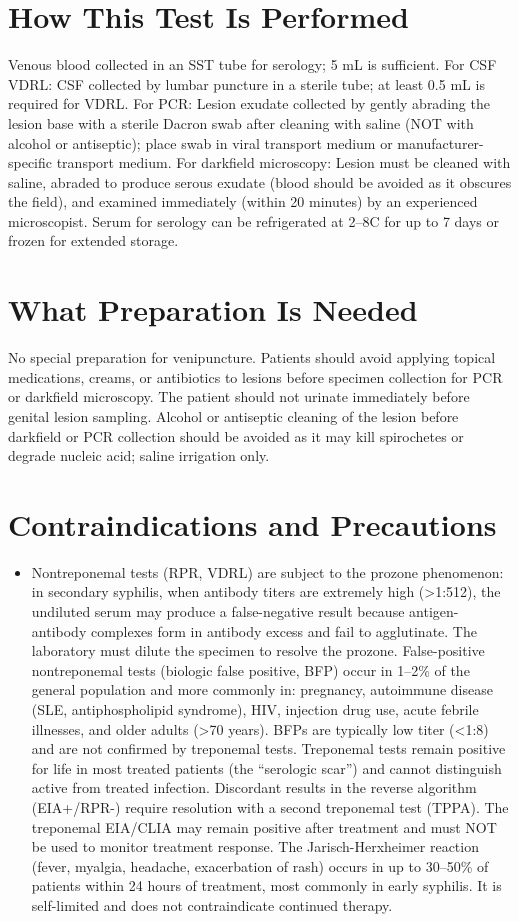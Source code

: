 \section*{How This Test Is Performed}
Venous blood collected in an SST tube for serology; 5 mL is sufficient. For CSF VDRL: CSF collected by lumbar puncture in a sterile tube; at least 0.5 mL is required for VDRL. For PCR: Lesion exudate collected by gently abrading the lesion base with a sterile Dacron swab after cleaning with saline (NOT with alcohol or antiseptic); place swab in viral transport medium or manufacturer-specific transport medium. For darkfield microscopy: Lesion must be cleaned with saline, abraded to produce serous exudate (blood should be avoided as it obscures the field), and examined immediately (within 20 minutes) by an experienced microscopist. Serum for serology can be refrigerated at 2--8\textdegree{}C for up to 7 days or frozen for extended storage.

\section*{What Preparation Is Needed}
No special preparation for venipuncture. Patients should avoid applying topical medications, creams, or antibiotics to lesions before specimen collection for PCR or darkfield microscopy. The patient should not urinate immediately before genital lesion sampling. Alcohol or antiseptic cleaning of the lesion before darkfield or PCR collection should be avoided as it may kill spirochetes or degrade nucleic acid; saline irrigation only.

\section*{Contraindications and Precautions}
\begin{itemize}
  \item Nontreponemal tests (RPR, VDRL) are subject to the prozone phenomenon: in secondary syphilis, when antibody titers are extremely high (>1:512), the undiluted serum may produce a false-negative result because antigen-antibody complexes form in antibody excess and fail to agglutinate. The laboratory must dilute the specimen to resolve the prozone. False-positive nontreponemal tests (biologic false positive, BFP) occur in 1--2\% of the general population and more commonly in: pregnancy, autoimmune disease (SLE, antiphospholipid syndrome), HIV, injection drug use, acute febrile illnesses, and older adults (>70 years). BFPs are typically low titer (<1:8) and are not confirmed by treponemal tests. Treponemal tests remain positive for life in most treated patients (the ``serologic scar'') and cannot distinguish active from treated infection. Discordant results in the reverse algorithm (EIA+/RPR-) require resolution with a second treponemal test (TPPA). The treponemal EIA/CLIA may remain positive after treatment and must NOT be used to monitor treatment response. The Jarisch-Herxheimer reaction (fever, myalgia, headache, exacerbation of rash) occurs in up to 30--50\% of patients within 24 hours of treatment, most commonly in early syphilis. It is self-limited and does not contraindicate continued therapy.
\end{itemize}
